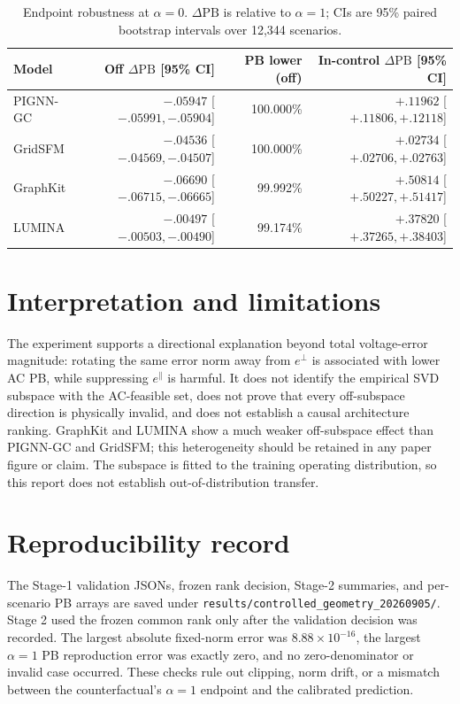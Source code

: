 \documentclass[10pt,a4paper]{article}
\newcommand{\PB}{\mathrm{PB}}
\begin{document}
\begin{table}[H]
\centering\footnotesize
\caption{Endpoint robustness at $\alpha=0$.  $\Delta\PB$ is relative to
$\alpha=1$; CIs are 95\% paired bootstrap intervals over 12,344 scenarios.}\label{tab:endpoint}
\begin{tabular}{lrrr}
\toprule
Model & Off $\Delta\PB$ [95\% CI] & PB lower (off) & In-control $\Delta\PB$ [95\% CI]\\
\midrule
PIGNN-GC & $-.05947$ [$-.05991,-.05904$] & 100.000\% & $+.11962$ [$+.11806,+.12118$]\\
GridSFM & $-.04536$ [$-.04569,-.04507$] & 100.000\% & $+.02734$ [$+.02706,+.02763$]\\
GraphKit & $-.06690$ [$-.06715,-.06665$] & 99.992\% & $+.50814$ [$+.50227,+.51417$]\\
LUMINA & $-.00497$ [$-.00503,-.00490$] & 99.174\% & $+.37820$ [$+.37265,+.38403$]\\
\bottomrule
\end{tabular}
\end{table}

\section{Interpretation and limitations}

The experiment supports a directional explanation beyond total voltage-error
magnitude: rotating the same error norm away from $e^\perp$ is associated with
lower AC PB, while suppressing $e^\parallel$ is harmful.  It does not identify
the empirical SVD subspace with the AC-feasible set, does not prove that every
off-subspace direction is physically invalid, and does not establish a causal
architecture ranking.  GraphKit and LUMINA show a much weaker off-subspace
effect than PIGNN-GC and GridSFM; this heterogeneity should be retained in any
paper figure or claim.  The subspace is fitted to the training operating
distribution, so this report does not establish out-of-distribution transfer.

\section{Reproducibility record}

The Stage-1 validation JSONs, frozen rank decision, Stage-2 summaries, and
per-scenario PB arrays are saved under
\texttt{results/controlled\_geometry\_20260905/}.  Stage 2 used the frozen
common rank only after the validation decision was recorded.  The largest
absolute fixed-norm error was $8.88\times10^{-16}$, the largest $\alpha=1$ PB
reproduction error was exactly zero, and no zero-denominator or invalid case
occurred.  These checks rule out clipping, norm drift, or a mismatch between
the counterfactual's $\alpha=1$ endpoint and the calibrated prediction.
\end{document}
